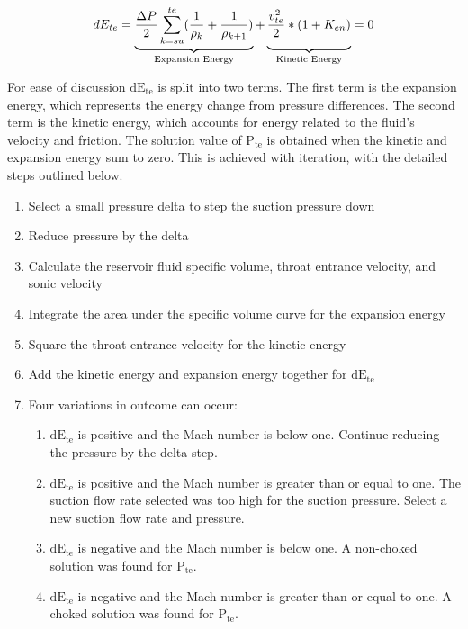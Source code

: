 \documentclass[12 pt]{report}
\newcommand{\dete}{$\mathrm{dE_{te}}$\xspace}  %
\newcommand{\pte}{$\mathrm{P_{te}}$\xspace}  %
\begin{document}
\begin{equation}
dE_{te} = \underbrace{\frac{\Delta P}{2}\sum_{k=su}^{te} (\frac{1}{\rho_{k}} + \frac{1}{\rho_{k+1}})}_{\text{Expansion Energy}} + \underbrace{\vphantom{\sum_{k=su}^{te}}{\frac{v_{te}^{2}}{2} * (1+K_{en})}}_{\text{Kinetic Energy}} = 0
\label{entr_trap}
\end{equation}

For ease of discussion \dete is split into two terms. The first term is the expansion energy, which represents the energy change from pressure differences. The second term is the kinetic energy, which accounts for energy related to the fluid's velocity and friction. The solution value of \pte{} is obtained when the kinetic and expansion energy sum to zero. This is achieved with iteration, with the detailed steps outlined below.
\begin{enumerate}
    \item Select a small pressure delta to step the suction pressure down
    \item Reduce pressure by the delta 
    \item Calculate the reservoir fluid specific volume, throat entrance velocity, and sonic velocity 
    \item Integrate the area under the specific volume curve for the expansion energy
    \item Square the throat entrance velocity for the kinetic energy
    \item Add the kinetic energy and expansion energy together for \dete{}
    \item Four variations in outcome can occur:
    \begin{enumerate}
        \item \dete{} is positive and the Mach number is below one. Continue reducing the pressure by the delta step.
        \item \dete{} is positive and the Mach number is greater than or equal to one. The suction flow rate selected was too high for the suction pressure. Select a new suction flow rate and pressure.
        \item \dete{} is negative and the Mach number is below one. A non-choked solution was found for \pte.
        \item \dete{} is negative and the Mach number is greater than or equal to one. A choked solution was found for \pte.
    \end{enumerate}
\end{enumerate}
\end{document}

